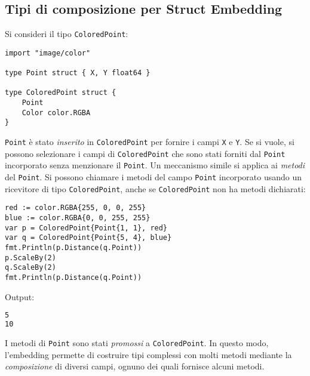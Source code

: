 \documentclass[../../thesis.tex]{subfiles}
\begin{document}
    \subsection{Tipi di composizione per Struct Embedding}\label{subsec:tipi-di-composizione-per-struct-embedding}
    Si consideri il tipo \verb"ColoredPoint":
    \begin{lstlisting}[frame = single, label = {lst:lstlisting5-3.1}]
import "image/color"

type Point struct { X, Y float64 }

type ColoredPoint struct {
    Point
    Color color.RGBA
}
    \end{lstlisting}
    \verb"Point" è stato \textit{inserito} in \verb"ColoredPoint" per fornire i campi \verb"X" e \verb"Y".
    Se si vuole, si possono selezionare i campi di \verb"ColoredPoint" che sono stati forniti dal \verb"Point" incorporato senza menzionare il \verb"Point".
    Un meccanismo simile si applica ai \textit{metodi} del \verb"Point".
    Si possono chiamare i metodi del campo \verb"Point" incorporato usando un ricevitore di tipo \verb"ColoredPoint", anche se \verb"ColoredPoint" non ha metodi dichiarati:
    \begin{lstlisting}[frame = single, label = {lst:lstlisting5-3.2}]
red := color.RGBA{255, 0, 0, 255}
blue := color.RGBA{0, 0, 255, 255}
var p = ColoredPoint{Point{1, 1}, red}
var q = ColoredPoint{Point{5, 4}, blue}
fmt.Println(p.Distance(q.Point))
p.ScaleBy(2)
q.ScaleBy(2)
fmt.Println(p.Distance(q.Point))
    \end{lstlisting}
    Output:
    \begin{lstlisting}[language = bash, frame = L, label = {lst:lstlisting5-3.3}]
5
10
    \end{lstlisting}
    I metodi di \verb"Point" sono stati \textit{promossi} a \verb"ColoredPoint".
    In questo modo, l'embedding permette di costruire tipi complessi con molti metodi mediante la \textit{composizione} di diversi campi, ognuno dei quali fornisce alcuni metodi.
    \hfill \vspace{12pt}
\end{document}
